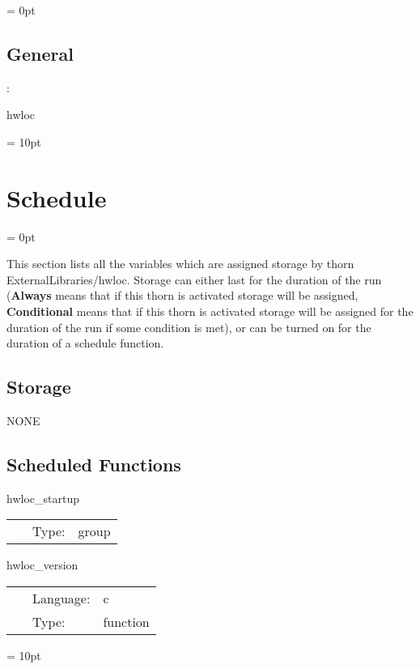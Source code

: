 \parskip = 0pt

\vspace{3mm} \subsection*{General}

: 

hwloc
\vspace{2mm}

\vspace{5mm}\parskip = 10pt 

\section{Schedule} 


\parskip = 0pt


\noindent This section lists all the variables which are assigned storage by thorn ExternalLibraries/hwloc.  Storage can either last for the duration of the run ({\bf Always} means that if this thorn is activated storage will be assigned, {\bf Conditional} means that if this thorn is activated storage will be assigned for the duration of the run if some condition is met), or can be turned on for the duration of a schedule function.


\subsection*{Storage}NONE
\subsection*{Scheduled Functions}
\vspace{5mm}


\hspace{5mm} hwloc\_startup 

\hspace{5mm}{\it hwloc startup group } 


\hspace{5mm}

 \begin{tabular*}{160mm}{cll} 
~ & Type:  & group \\ 
\end{tabular*} 


\vspace{5mm}


\hspace{5mm} hwloc\_version 

\hspace{5mm}{\it output hwloc version } 


\hspace{5mm}

 \begin{tabular*}{160mm}{cll} 
~ & Language:  & c \\ 
~ & Type:  & function \\ 
\end{tabular*} 



\vspace{5mm}\parskip = 10pt 

